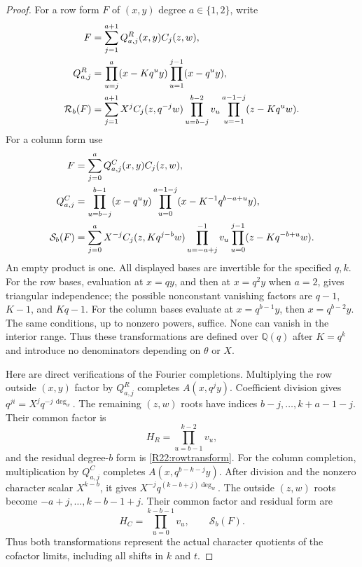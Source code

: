 \documentclass[11pt,a4paper]{article}
\theoremstyle{definition}\newtheorem{definition}{Definition}
\begin{document}
\begin{proof}
For a row form $F$ of $(x,y)$ degree $a\in\{1,2\}$, write
\begin{align}
 F&=\sum_{j=1}^{a+1}Q^R_{a,j}(x,y)C_j(z,w),\notag\\
 Q^R_{a,j}&=\prod_{u=j}^{a}(x-Kq^uy)
                       \prod_{u=1}^{j-1}(x-q^uy),\label{R22:rowbasis}\\
 \mathcal R_b(F)&=\sum_{j=1}^{a+1}X^j C_j(z,q^{-j}w)
       \prod_{u=b-j}^{b-2}v_u
       \prod_{u=-1}^{a-1-j}(z-Kq^uw).\label{R22:rowtransform}
\end{align}
For a column form use
\begin{align}
 F&=\sum_{j=0}^{a}Q^C_{a,j}(x,y)C_j(z,w),\notag\\
 Q^C_{a,j}&=\prod_{u=b-j}^{b-1}(x-q^uy)
               \prod_{u=0}^{a-1-j}(x-K^{-1}q^{b-a+u}y),
                                                     \label{R22:colbasis}\\
 \mathcal S_b(F)&=\sum_{j=0}^{a}X^{-j}C_j(z,Kq^{j-b}w)
       \prod_{u=-a+j}^{-1}v_u
       \prod_{u=0}^{j-1}(z-Kq^{-b+u}w).\label{R22:coltransform}
\end{align}
An empty product is one. All displayed bases are invertible for the
specified $q,k$. For the row bases, evaluation at $x=qy$, and then
at $x=q^2y$ when $a=2$, gives triangular independence; the possible
nonconstant vanishing factors are $q-1$, $K-1$, and $Kq-1$.
For the column bases evaluate at $x=q^{b-1}y$, then
$x=q^{b-2}y$. The same conditions, up to nonzero powers, suffice.
None can vanish in the interior range. Thus these transformations are
defined over $\mathbb Q(q)$ after $K=q^k$ and introduce no denominators
depending on $\theta$ or $X$.

Here are direct verifications of the Fourier completions.
Multiplying the row outside $(x,y)$ factor by $Q^R_{a,j}$ completes
$A(x,q^jy)$. Coefficient division gives $q^{ji}=X^jq^{-j\,\deg_w}$.
The remaining $(z,w)$ roots have indices $b-j,\ldots,k+a-1-j$.
Their common factor is
\[
 H_R=\prod_{u=b-1}^{k-2}v_u,
\]
and the residual degree-$b$ form is \eqref{R22:rowtransform}.
For the column completion, multiplication by $Q^C_{a,j}$ completes
$A(x,q^{b-k-j}y)$. After division and the nonzero character scalar
$X^{k-b}$, it gives $X^{-j}q^{(k-b+j)\deg_w}$.
The outside $(z,w)$ roots become $-a+j,\ldots,k-b-1+j$.
Their common factor and residual form are
\[
 H_C=\prod_{u=0}^{k-b-1}v_u,
 \qquad \mathcal S_b(F).
\]
Thus both transformations represent the actual character quotients
of the cofactor limits, including all shifts in $k$ and $t$.


\end{proof}
\end{document}
